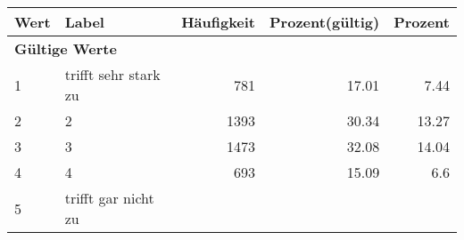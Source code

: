      \begin{longtable}{lXrrr}
     \toprule
     \textbf{Wert} & \textbf{Label} & \textbf{Häufigkeit} & \textbf{Prozent(gültig)} & \textbf{Prozent} \\
     \endhead
     \midrule
     \multicolumn{5}{l}{\textbf{Gültige Werte}}\\

     1 &
     \multicolumn{1}{X}{ trifft sehr stark zu   } &


       \num{781} &
       \num[round-mode=places,round-precision=2]{17,01} &
         \num[round-mode=places,round-precision=2]{7,44} \\

     2 &
     \multicolumn{1}{X}{ 2   } &


       \num{1393} &
       \num[round-mode=places,round-precision=2]{30,34} &
         \num[round-mode=places,round-precision=2]{13,27} \\

     3 &
     \multicolumn{1}{X}{ 3   } &


       \num{1473} &
       \num[round-mode=places,round-precision=2]{32,08} &
         \num[round-mode=places,round-precision=2]{14,04} \\

     4 &
     \multicolumn{1}{X}{ 4   } &


       \num{693} &
       \num[round-mode=places,round-precision=2]{15,09} &
         \num[round-mode=places,round-precision=2]{6,6} \\

     5 &
     \multicolumn{1}{X}{ trifft gar nicht zu   } &



\end{longtable}
